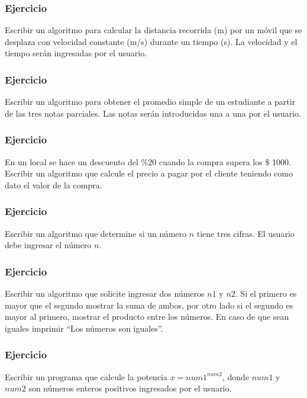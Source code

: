 \pagebreak
\subsubsection{Ejercicio}
Escribir un algoritmo para calcular la distancia recorrida (m) por un móvil que se desplaza con velocidad constante (m/s) durante un tiempo (s). 
La velocidad y el tiempo serán ingresadas por el usuario.

\subsubsection{Ejercicio}
Escribir un algoritmo para obtener el promedio simple de un estudiante a partir de las tres notas parciales.
Las notas serán introducidas una a una por el usuario.

\subsubsection{Ejercicio}
En un local se hace un descuento del \%20 cuando la compra supera los \$ 1000. Escribir un algoritmo que calcule el precio a pagar por el cliente
teniendo como dato el valor de la compra.

\subsubsection{Ejercicio}
Escribir un algoritmo que determine si un número $n$ tiene tres cifras. El usuario debe ingresar el número $n$.

\subsubsection{Ejercicio}
Escribir un algoritmo que solicite ingresar dos números $n1$ y $n2$. Si el primero es mayor que el segundo mostrar la suma de ambos, por otro lado si el segundo es mayor al primero, mostrar el producto entre los números. En caso de que sean iguales imprimir ``Los números son iguales''.

\subsubsection{Ejercicio}
Escribir un programa que calcule la potencia $x={num1}^{num2}$, donde $num1$ y $num2$ son números enteros positivos ingresados por el usuario.

